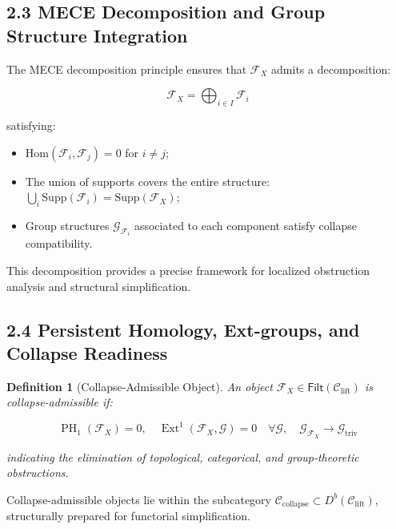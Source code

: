 \documentclass[11pt]{article}
\newtheorem{definition}[theorem]{Definition}
\DeclareMathOperator{\Ext}{Ext}
\DeclareMathOperator{\PH}{PH}
\begin{document}
\subsection{2.3 MECE Decomposition and Group Structure Integration}

The MECE decomposition principle ensures that $\mathcal{F}_X$ admits a decomposition:

\begin{equation}
\mathcal{F}_X = \bigoplus_{i \in I} \mathcal{F}_i
\end{equation}

satisfying:

\begin{itemize}
    \item $\mathrm{Hom}(\mathcal{F}_i, \mathcal{F}_j) = 0$ for $i \neq j$;
    \item The union of supports covers the entire structure: $\bigcup_i \mathrm{Supp}(\mathcal{F}_i) = \mathrm{Supp}(\mathcal{F}_X)$;
    \item Group structures $\mathcal{G}_{\mathcal{F}_i}$ associated to each component satisfy collapse compatibility.
\end{itemize}

This decomposition provides a precise framework for localized obstruction analysis and structural simplification.

\subsection{2.4 Persistent Homology, Ext-groups, and Collapse Readiness}

\begin{definition}[Collapse-Admissible Object]
An object $\mathcal{F}_X \in \mathsf{Filt}(\mathcal{C}_{\mathrm{lift}})$ is \emph{collapse-admissible} if:

\begin{equation}
\PH_1(\mathcal{F}_X) = 0, \quad \Ext^1(\mathcal{F}_X, \mathcal{G}) = 0 \quad \forall \mathcal{G}, \quad \mathcal{G}_{\mathcal{F}_X} \longrightarrow \mathcal{G}_{\mathrm{triv}}
\end{equation}

indicating the elimination of topological, categorical, and group-theoretic obstructions.
\end{definition}

Collapse-admissible objects lie within the subcategory $\mathcal{C}_{\mathrm{collapse}} \subset D^b(\mathcal{C}_{\mathrm{lift}})$, structurally prepared for functorial simplification.
\end{document}
